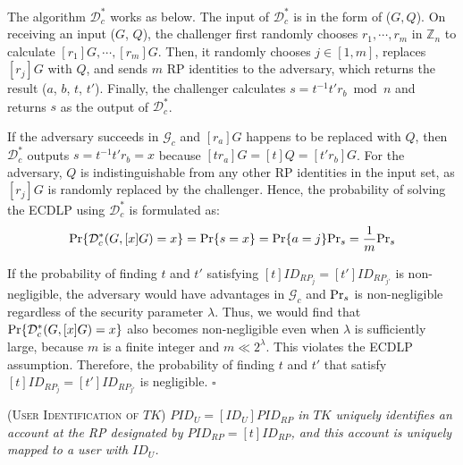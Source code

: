 The algorithm $\mathcal{D}^*_c$ works as below.
The input of $\mathcal{D}^*_c$ is in the form of ($G, Q$). On receiving an input ($G$, $Q$), the challenger first randomly chooses $r_1, \cdots, r_m$ in $\mathbb{Z}_n$ to calculate $[r_1]G, \cdots, [r_m]G$.
Then, it randomly chooses $j \in [1,m]$, replaces $[r_j]G$ with $Q$, and sends $m$ RP identities to the adversary, which returns the result ($a$, $b$, $t$, $t'$). Finally, the challenger calculates $s = t^{-1}t'r_b \bmod n$ and returns $s$ as the output of $\mathcal{D}^*_c$.

If the adversary succeeds in $\mathcal{G}_c$ and $[r_a]G$ happens to be replaced with $Q$, then $\mathcal{D}^*_c$ outputs $s=t^{-1}t'r_b =x$ because $[tr_a]G = [t]Q = [t'r_b]G$. For the adversary, $Q$ is indistinguishable from any other RP identities in the input set, as $[r_j]G$ is randomly replaced by the challenger.
Hence, the probability of solving the ECDLP using $\mathcal{D}^*_c$ is formulated as:
\begin{equation*}
{\rm Pr}\{\mathcal{D}^*_c(G, [x]G)=x\} = {\rm Pr}\{s = x\}={\rm Pr}\{a=j\}{\rm Pr}_s=\frac{1}{m}{\rm Pr}_s
\end{equation*}

If the probability of finding $t$ and $t'$ satisfying $[t]ID_{RP_j} = [t']ID_{RP_{j'}}$ is non-negligible, the adversary would have advantages  in $\mathcal{G}_c$ and ${\rm Pr}_s$ is non-negligible regardless of the security parameter $\lambda$.
Thus, we would find that ${\rm Pr}\{\mathcal{D}^*_c(G, [x]G)=x\}$ also becomes non-negligible even when $\lambda$ is sufficiently large, because $m$ is a finite integer and $m \ll 2^\lambda$.
This violates the ECDLP assumption. Therefore, the probability of finding $t$ and $t'$ that satisfy $[t]ID_{RP_j} = [t']ID_{RP_{j'}}$ is negligible.
\hfill $\square$







\begin{lemma}
\textsc{(User Identification of $TK$)} \emph{$PID_U= [ID_U]PID_{RP}$ in $TK$ uniquely identifies an account at the RP designated by $PID_{RP} = [t]ID_{RP}$, and this account is uniquely mapped to a user with $ID_U$.}
\label{lemma-user-id}
\end{lemma}

